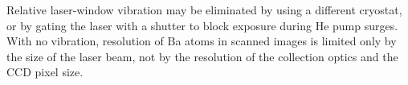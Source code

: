 Relative laser-window vibration may be eliminated by using a different cryostat, or by gating the laser with a shutter to block exposure during He pump surges.  With no vibration, resolution of Ba atoms in scanned images is limited only by the size of the laser beam, not by the resolution of the collection optics and the CCD pixel size.


